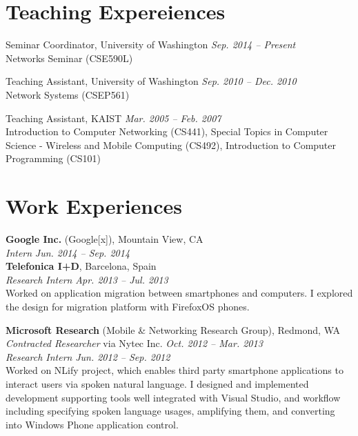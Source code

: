 \documentclass[margin,line]{res}
\begin{document}
\begin{resume}
\section{\sc Teaching Expereiences}
Seminar Coordinator, University of Washington \hfill{\it Sep. 2014 -- Present} \\
Networks Seminar (CSE590L)

Teaching Assistant, University of Washington \hfill{\it Sep. 2010 -- Dec. 2010} \\
Network Systems (CSEP561)

Teaching Assistant, KAIST \hfill{\it Mar. 2005 -- Feb. 2007} \\
Introduction to Computer Networking (CS441), Special Topics in Computer Science - Wireless and Mobile Computing (CS492), Introduction to Computer Programming (CS101)


\section{\sc Work Experiences}
{\bf Google Inc.} (Google[x]), Mountain View, CA \\
{\em Intern} \hfill {\it Jun. 2014 -- Sep. 2014} \\

{\bf Telefonica I+D}, Barcelona, Spain \\
{\em Research Intern} \hfill {\it Apr. 2013 -- Jul. 2013} \\
Worked on application migration between smartphones and computers. 
I explored the design for migration platform with FirefoxOS phones.

{\bf Microsoft Research} (Mobile \& Networking Research Group), Redmond, WA \\
{\em Contracted Researcher} via Nytec Inc. \hfill {\it Oct. 2012 -- Mar. 2013} \\
{\em Research Intern} \hfill {\it Jun. 2012 -- Sep. 2012} \\
Worked on NLify project, which enables third party smartphone applications to
interact users via spoken natural language. I designed and implemented
development supporting tools well integrated with Visual Studio, and workflow
including specifying spoken language usages, amplifying them, and converting
into Windows Phone application control.


\end{resume}
\end{document}
